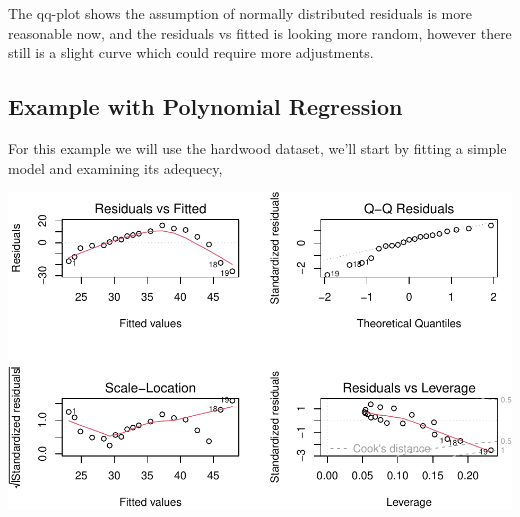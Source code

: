 \documentclass[
  11pt,
]{article}
\newenvironment{Shaded}{\begin{snugshade}}{\end{snugshade}}
\newcommand{\AttributeTok}[1]{\textcolor[rgb]{0.13,0.29,0.53}{#1}}
\newcommand{\ConstantTok}[1]{\textcolor[rgb]{0.56,0.35,0.01}{#1}}
\newcommand{\DecValTok}[1]{\textcolor[rgb]{0.00,0.00,0.81}{#1}}
\newcommand{\FunctionTok}[1]{\textcolor[rgb]{0.13,0.29,0.53}{\textbf{#1}}}
\newcommand{\NormalTok}[1]{#1}
\newcommand{\OtherTok}[1]{\textcolor[rgb]{0.56,0.35,0.01}{#1}}
\newcommand{\SpecialCharTok}[1]{\textcolor[rgb]{0.81,0.36,0.00}{\textbf{#1}}}
\newcommand{\StringTok}[1]{\textcolor[rgb]{0.31,0.60,0.02}{#1}}
\begin{document}
The qq-plot shows the assumption of normally distributed residuals is
more reasonable now, and the residuals vs fitted is looking more random,
however there still is a slight curve which could require more
adjustments.

\subsection{Example with Polynomial
Regression}\label{example-with-polynomial-regression}

For this example we will use the hardwood dataset, we'll start by
fitting a simple model and examining its adequecy,

\begin{Shaded}
\end{Shaded}

\includegraphics{examples_files/figure-latex/unnamed-chunk-46-1.pdf}
\end{document}
